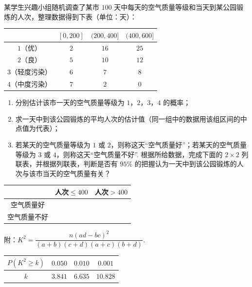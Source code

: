 \begin{problem}
某学生兴趣小组随机调查了某市 \(100\) 天中每天的空气质量等级和当天到某公园锻炼的人次，整理数据得到下表（单位：天）：


\newcommand{\airqualityheader}{%
    \choicetexfigure{img_repaint/2020/national_paper_3_liberal/q18_fig1.tex}%
}

\begin{center}
\begin{tabular}{c|ccc}
\airqualityheader & \([0,200]\) & \((200,400]\) & \((400,600]\) \\
\hline
\(1\)（优） & \(2\) & \(16\) & \(25\) \\
\(2\)（良） & \(5\) & \(10\) & \(12\) \\
\(3\)（轻度污染） & \(6\) & \(7\) & \(8\) \\
\(4\)（中度污染） & \(7\) & \(2\) & \(0\)
\end{tabular}
\end{center}

\begin{enumerate}
    \item 分别估计该市一天的空气质量等级为 \(1\)，\(2\)，\(3\)，\(4\) 的概率；
    \item 求一天中到该公园锻炼的平均人次的估计值（同一组中的数据用该组区间的中点值为代表）；
    \item 若某天的空气质量等级为 \(1\) 或 \(2\)，则称这天“空气质量好”；若某天的空气质量等级为 \(3\) 或 \(4\)，则称这天“空气质量不好”. 根据所给数据，完成下面的 \(2\times 2\) 列联表，并根据列联表，判断是否有 \(95\%\) 的把握认为一天中到该公园锻炼的人次与该市当天的空气质量有关？
\end{enumerate}

\begin{center}
\begin{tabular}{c|cc}
 & 人次\(\le 400\) & 人次\(>400\) \\
\hline
空气质量好 &  &  \\
空气质量不好 &  &
\end{tabular}
\end{center}

附：\(K^2=\dfrac{n(ad-bc)^2}{(a+b)(c+d)(a+c)(b+d)}\).

\begin{center}
\begin{tabular}{c|ccc}
\(P(K^2\ge k)\) & \(0.050\) & \(0.010\) & \(0.001\) \\
\hline
\(k\) & \(3.841\) & \(6.635\) & \(10.828\)
\end{tabular}
\end{center}
\end{problem}


